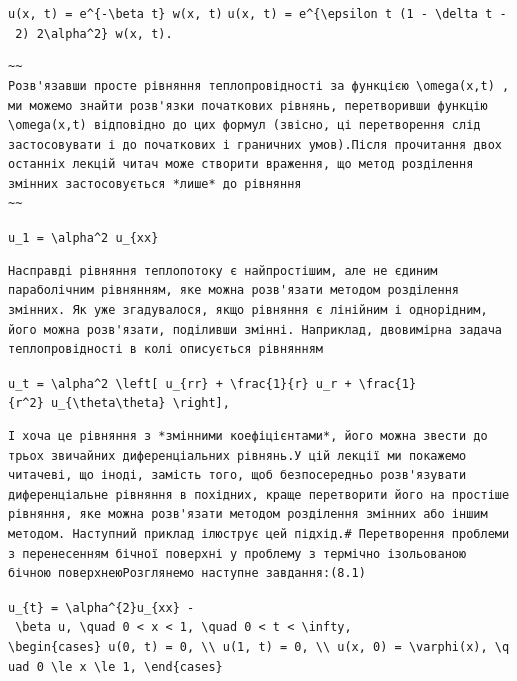 \documentclass[
  ukrainian,
]{article}
\begin{document}
\texttt{u(x,\ t)\ =\ e\^{}\{-\textbackslash{}beta\ t\}\ w(x,\ t)}
\texttt{u(x,\ t)\ =\ e\^{}\{\textbackslash{}epsilon\ t\ (1\ -\ \textbackslash{}delta\ t\ -\ 2)\ 2\textbackslash{}alpha\^{}2\}\ w(x,\ t).}

\begin{verbatim}
~~
Розв'язавши просте рівняння теплопровідності за функцією \omega(x,t) , ми можемо знайти розв'язки початкових рівнянь, перетворивши функцію \omega(x,t) відповідно до цих формул (звісно, ці перетворення слід застосовувати і до початкових і граничних умов).Після прочитання двох останніх лекцій читач може створити враження, що метод розділення змінних застосовується *лише* до рівняння
~~
\end{verbatim}

\texttt{u\_1\ =\ \textbackslash{}alpha\^{}2\ u\_\{xx\}}

\begin{verbatim}
Насправді рівняння теплопотоку є найпростішим, але не єдиним параболічним рівнянням, яке можна розв'язати методом розділення змінних. Як уже згадувалося, якщо рівняння є лінійним і однорідним, його можна розв'язати, поділивши змінні. Наприклад, двовимірна задача теплопровідності в колі описується рівнянням
\end{verbatim}

\texttt{u\_t\ =\ \textbackslash{}alpha\^{}2\ \textbackslash{}left{[}\ u\_\{rr\}\ +\ \textbackslash{}frac\{1\}\{r\}\ u\_r\ +\ \textbackslash{}frac\{1\}\{r\^{}2\}\ u\_\{\textbackslash{}theta\textbackslash{}theta\}\ \textbackslash{}right{]},}

\begin{verbatim}
І хоча це рівняння з *змінними коефіцієнтами*, його можна звести до трьох звичайних диференціальних рівнянь.У цій лекції ми покажемо читачеві, що іноді, замість того, щоб безпосередньо розв'язувати диференціальне рівняння в похідних, краще перетворити його на простіше рівняння, яке можна розв'язати методом розділення змінних або іншим методом. Наступний приклад ілюструє цей підхід.# Перетворення проблеми з перенесенням бічної поверхні у проблему з термічно ізольованою бічною поверхнеюРозглянемо наступне завдання:(8.1)
\end{verbatim}

\texttt{u\_\{t\}\ =\ \textbackslash{}alpha\^{}\{2\}u\_\{xx\}\ -\ \textbackslash{}beta\ u,\ \textbackslash{}quad\ 0\ \textless{}\ x\ \textless{}\ 1,\ \textbackslash{}quad\ 0\ \textless{}\ t\ \textless{}\ \textbackslash{}infty,}
\texttt{\textbackslash{}begin\{cases\}\ u(0,\ t)\ =\ 0,\ \textbackslash{}\textbackslash{}\ u(1,\ t)\ =\ 0,\ \textbackslash{}\textbackslash{}\ u(x,\ 0)\ =\ \textbackslash{}varphi(x),\ \textbackslash{}quad\ 0\ \textbackslash{}le\ x\ \textbackslash{}le\ 1,\ \textbackslash{}end\{cases\}}
\end{document}

